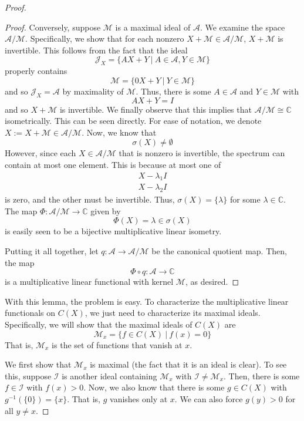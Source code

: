\documentclass[fontsize=11pt]{scrartcl} %
\numberwithin{equation}{section} %
\numberwithin{figure}{section} %
\numberwithin{table}{section} %
\newcommand{\C}{\mathbb{C}}
\begin{document}
\begin{proof}
\begin{proof}
        Conversely, suppose $\mathscr{M}$ is a maximal ideal of $\mathscr{A}$.
        We examine the space $\mathscr{A}/{\mathscr{M}}$. Specifically, we show
        that for each nonzero $X+\mathscr{M}\in\mathscr{A}/{\mathscr{M}}$,
        $X+\mathscr{M}$ is invertible. This follows from the fact that the ideal
        \[
            \mathscr{J}_X = \{AX+Y\ |\ A\in\mathscr{A},Y\in\mathscr{M}\}
        \]
        properly contains
        \[
            \mathscr{M} = \{0X+Y\ |\ Y\in\mathscr{M}\}
        \]
        and so $\mathscr{J}_X=\mathscr{A}$ by maximality of $\mathscr{M}$. Thus,
        there is some $A\in\mathscr{A}$ and $Y\in\mathscr{M}$ with
        \[
            AX+Y=I
        \]
        and so $X+\mathscr{M}$ is invertible. We finally observe that this
        implies that $\mathscr{A}/{\mathscr{M}}\cong \C$ isometrically. This can
        be seen directly. For ease of notation, we denote $X:=
        X+\mathscr{M}\in\mathscr{A}/{\mathscr{M}}$. Now, we know that
        \[
            \sigma(X)\neq \emptyset
        \]
        However, since each $X\in\mathscr{A}/{\mathscr{M}}$ that is nonzero is
        invertible, the spectrum can contain at most one element. This is
        because at most one of
        \[
\begin{aligned}
    X-\lambda_1 I\\
    X-\lambda_2 I
\end{aligned}
        \]
        is zero, and the other must be invertible. Thus, $\sigma(X)=\{\lambda\}$
        for some $\lambda\in \C$. The map $\Phi:\mathscr{A}/{\mathscr{M}}\to \C$
        given by
        \[
            \Phi(X) = \lambda\in\sigma(X)
        \]
        is easily seen to be a bijective multiplicative linear isometry.

        Putting it all together, let $q:\mathscr{A}\to\mathscr{A}/{\mathscr{M}}$
        be the canonical quotient map. Then, the map
        \[
            \Phi\circ q:\mathscr{A}\to \C
        \]
        is a multiplicative linear functional with kernel $\mathscr{M}$, as
        desired.
    \end{proof}

    With this lemma, the problem is easy. To characterize the multiplicative
    linear functionals on $C(X)$, we just need to characterize its maximal
    ideals. Specifically, we will show that the maximal ideals of $C(X)$ are
    \[
        \mathscr{M}_x = \{f\in C(X)\ |\ f(x)=0\}
    \]
    That is, $\mathscr{M}_x$ is the set of functions that vanish at $x$.

    We first show that $\mathscr{M}_x$ is maximal (the fact that it is an ideal
    is clear). To see this, suppose $\mathscr{I}$ is another ideal containing
    $\mathscr{M}_x$ with $\mathscr{I}\neq \mathscr{M}_x$. Then, there is some
    $f\in \mathscr{I}$ with $f(x)> 0$. Now, we also know that there is some
    $g\in C(X)$ with $g^{-1}(\{0\}) = \{x\}$. That is, $g$ vanishes only at $x$.
    We can also force $g(y)>0$ for all $y\neq x$.


\end{proof}
\end{document}
